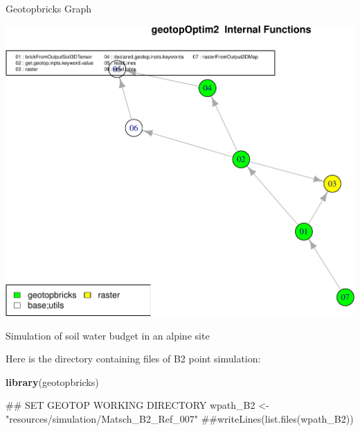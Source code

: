 \documentclass[ignorenonframetext,]{beamer}
\newenvironment{Shaded}{\begin{snugshade}}{\end{snugshade}}
\newcommand{\KeywordTok}[1]{\textcolor[rgb]{0.13,0.29,0.53}{\textbf{#1}}}
\newcommand{\StringTok}[1]{\textcolor[rgb]{0.31,0.60,0.02}{#1}}
\newcommand{\NormalTok}[1]{#1}
\begin{document}
\begin{frame}{Geotopbricks Graph}

\includegraphics{presentation_files/figure-beamer/unnamed-chunk-1-1.pdf}

\end{frame}

\begin{frame}[fragile]{Simulation of soil water budget in an alpine
site}

Here is the directory containing files of B2 point simulation:

\begin{Shaded}
\begin{Highlighting}[]
\KeywordTok{library}\NormalTok{(geotopbricks) }

\NormalTok{## SET GEOTOP WORKING DIRECTORY}
\NormalTok{wpath_B2 <-}\StringTok{ "resources/simulation/Matsch_B2_Ref_007"} 
\NormalTok{##writeLines(list.files(wpath_B2))}
\end{Highlighting}
\end{Shaded}

\end{frame}
\end{document}
